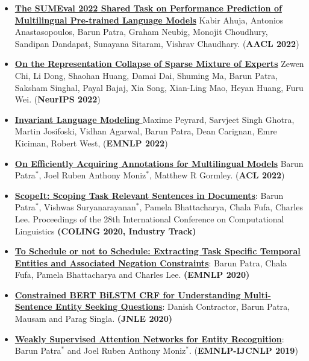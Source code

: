 \documentclass[8pt,a4paper]{article}
\begin{document}
{\begin{itemize}[label={}]
    \item \href{https://aclanthology.org/2022.sumeval-1.1.pdf}{\textbf{The SUMEval 2022 Shared Task on Performance Prediction of Multilingual Pre-trained Language Models}} Kabir Ahuja, Antonios Anastasopoulos, Barun Patra, Graham Neubig, Monojit Choudhury, Sandipan Dandapat, Sunayana Sitaram, Vishrav Chaudhary. (\textbf{AACL 2022})
    \item \href{https://arxiv.org/pdf/2204.09179.pdf}{\textbf{On the Representation Collapse of Sparse Mixture of Experts}} Zewen Chi, Li Dong, Shaohan Huang, Damai Dai, Shuming Ma, Barun Patra, Saksham Singhal, Payal Bajaj, Xia Song, Xian-Ling Mao, Heyan Huang, Furu Wei. (\textbf{NeurIPS 2022})
    \item \href{https://arxiv.org/pdf/2110.08413.pdf}{\textbf{Invariant Language Modeling }} Maxime Peyrard, Sarvjeet Singh Ghotra, Martin Josifoski, Vidhan Agarwal, Barun Patra, Dean Carignan, Emre Kiciman, Robert West, (\textbf{EMNLP 2022})
    \item \href{https://arxiv.org/abs/2204.01016}{\textbf{On Efficiently Acquiring Annotations for Multilingual Models}} Barun Patra$^{*}$, Joel Ruben Anthony Moniz$^{*}$, Matthew R Gormley. (\textbf{ACL 2022})
    \item \href{https://arxiv.org/pdf/2003.04988.pdf}{\textbf{ScopeIt: Scoping Task Relevant Sentences in Documents}}: Barun Patra$^{*}$, Vishwas Suryanarayanan$^{*}$, Pamela Bhattacharya, Chala Fufa, Charles Lee. Proceedings of the 28th International Conference on Computational Linguistics \textbf{(COLING 2020, Industry Track)}
    \item \href{https://www.aclweb.org/anthology/2020.emnlp-main.678.pdf}{\textbf{To Schedule or not to Schedule: Extracting Task Specific Temporal Entities and Associated Negation Constraints}}: Barun Patra, Chala Fufa, Pamela Bhattacharya and Charles Lee. \textbf{(EMNLP 2020)}
    \item \href{https://www.cambridge.org/core/journals/natural-language-engineering/article/constrained-bert-bilstm-crf-for-understanding-multisentence-entityseeking-questions/891F2A9DAD6642A17D8B67523EC45316}{\textbf{Constrained BERT BiLSTM CRF for Understanding Multi-Sentence Entity Seeking Questions}}: Danish Contractor, Barun Patra, Mausam and Parag Singla. \textbf{(JNLE 2020)}
    \item \href{https://www.aclweb.org/anthology/D19-1652.pdf}{\textbf{Weakly Supervised Attention Networks for Entity Recognition}}: Barun Patra$^{*}$ and Joel Ruben Anthony Moniz$^{*}$. (\textbf{EMNLP-IJCNLP 2019})

\end{itemize}}
\end{document}
